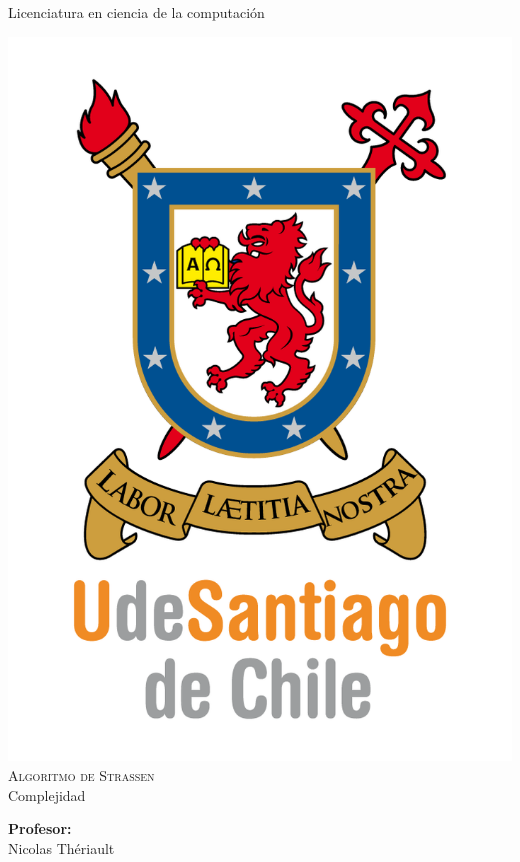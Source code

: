 \documentclass[12pt,letterpaper]{scrartcl}
\author{Don cuyi}
\begin{document}
\begin{titlepage}

\begin{center}

{\Large { Licenciatura en ciencia de la computación} }

\includegraphics[scale=1]{UDSCNRJ}
\\[1cm]

{\Huge \textsc{Algoritmo de Strassen}}\\[0.7cm]

{\huge Complejidad}\\[2cm]


\begin{minipage}[l]{0.4\textwidth}
	\begin{flushleft}
	\linespread{1}
		\textbf{\textsf{Profesor:}}\\
		\large Nicolas Thériault
	\end{flushleft}
\end{minipage}
\begin{minipage}[l]{0.4\textwidth}


\end{minipage}
\end{center}
\end{titlepage}
\end{document}
